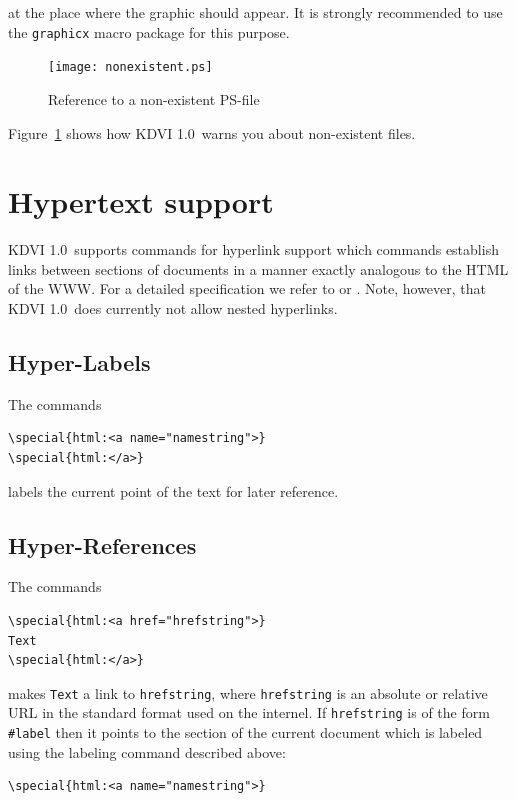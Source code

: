 \documentclass{article}
\newcommand{\KDVI}{{\sf KDVI 1.0}}
\begin{document}
at the place where the graphic should appear. It is strongly
recommended to use the {\tt graphicx} macro package for this purpose.
\begin{figure}
  \begin{center}
    \texttt{[image: nonexistent.ps]}
  \end{center}
\caption{Reference to a non-existent PS-file\label{nonex-special}}
\end{figure}
Figure~\ref{nonex-special} shows how \KDVI\ warns you about
non-existent files.


\section{Hypertext support}

\KDVI\ supports commands for hyperlink support which commands
establish links between sections of documents in a manner exactly
analogous to the HTML of the WWW. For a detailed specification we
refer to \cite{HFAQ99} or \cite{Rah98}. Note, however, that \KDVI\ 
does currently not allow nested hyperlinks.

\subsection{Hyper-Labels}

The commands
\begin{verbatim}
\special{html:<a name="namestring">}
\special{html:</a>}
\end{verbatim}
labels the current point of the text for later reference.

\subsection{Hyper-References}

The commands 
\begin{verbatim}
\special{html:<a href="hrefstring">}
Text
\special{html:</a>}
\end{verbatim}
makes {\tt Text} a link to {\tt hrefstring}, where {\tt hrefstring} is
an absolute or relative URL in the standard format used on the
internel. If {\tt hrefstring} is of the form {\tt \#label} then it
points to the section of the current document which is labeled using
the labeling command described above:
\begin{verbatim}
\special{html:<a name="namestring">}
\end{verbatim}
\end{document}
